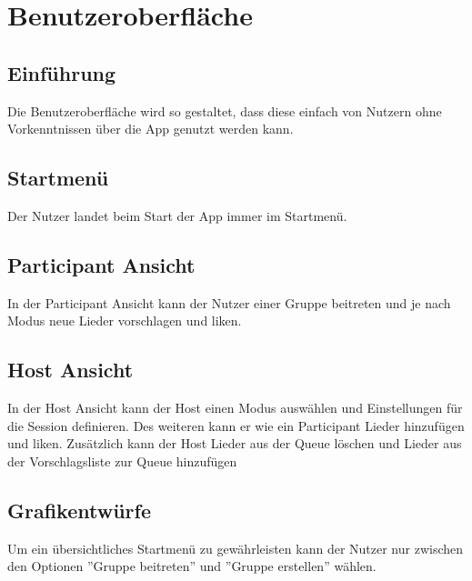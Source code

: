 \documentclass[oneside, ngerman]{sdqtechreport}
\begin{document}
\chapter{Benutzeroberfläche}
\label{chap:Benutzeroberfläche}

\section{Einführung}
\label{sec:Benutzeroberfläche:Einführung}
\textbf{} Die Benutzeroberfläche wird so gestaltet, dass diese einfach von Nutzern ohne Vorkenntnissen über die App genutzt werden kann.

\section{Startmenü}
\label{sec:Benutzeroberfläche:Startmenü}
Der Nutzer landet beim Start der App immer im Startmenü.

\section{Participant Ansicht}
\label{sec:Benutzeroberfläche:participantAnsicht}
In der Participant Ansicht kann der Nutzer einer Gruppe beitreten und je nach Modus neue Lieder vorschlagen und liken.

\section{Host Ansicht}
\label{sec:Benutzeroberfläche:hostAnsicht}
In der Host Ansicht kann der Host einen Modus auswählen und Einstellungen für die Session definieren. Des weiteren kann er wie ein Participant Lieder hinzufügen und liken. Zusätzlich kann der Host Lieder aus der Queue löschen und Lieder aus der Vorschlagsliste zur Queue hinzufügen

\section{Grafikentwürfe}
\label{sec:Benutzeroberfläche:Grafikentwürfe}
Um ein übersichtliches Startmenü zu gewährleisten kann der Nutzer nur zwischen den Optionen ''Gruppe beitreten'' und ''Gruppe erstellen'' wählen. 

%
\makeatletter
\setlength{\@fptop}{1cm}
\makeatother
%
\end{document}
